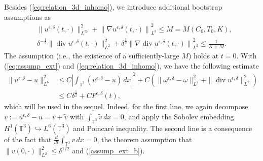 \documentclass[reqno,10pt]{amsart}
\theoremstyle{definition}
\theoremstyle{remark}
\numberwithin{equation}{section}
\DeclareMathOperator{\dive}{div}
\begin{document}
Besides (\ref{eq:relation_3d_inhomo}), we introduce additional bootstrap assumptions as
\begin{subequations} \label{eq:assump_ext}
\begin{align}
    &\|u^{\epsilon,\delta}(t,\cdot)\|_{L^\infty}^2 + {\| \nabla u^{\epsilon,\delta}(t,\cdot)\|}_{L^3}^2 \le M=M(C_0, T_0,K), \label{assump_ext_a} \\
    &\delta^{-\frac{1}{2}}\|\dive u^{\epsilon,\delta}(t,\cdot)\|_{L^2}^2 + \delta^{\frac{1}{2}} {\| \nabla\dive u^{\epsilon,\delta}(t,\cdot)\|}_{L^2}^2 \le \frac{1}{K+M}. \label{assump_ext_b}
\end{align}
\end{subequations}
The assumption (i.e., the existence of a sufficiently-large $M$) holds at $t=0$. With (\ref{eq:assump_ext}) and (\ref{eq:relation_3d_inhomo}), we have the following estimate
\begin{equation} \label{eq:v_L6}
\begin{split}
    \| u^{\epsilon,\delta}-u \|_{L^6}^2 &\le C \left| \int_{\mathbb T^3} (u^{\epsilon,\delta}-u) \,dx \right|^2 + C \left( \| \omega^{\epsilon,\delta}-\omega \|_{L^2}^2 + \| \dive u^{\epsilon,\delta} \|_{L^2}^2 \right) \\
    &\le C\delta^{\frac{1}{2}} + CF^{\epsilon,\delta}(t),
\end{split}
\end{equation}
which will be used in the sequel. Indeed, for the first line, we again decompose $v:=u^{\epsilon,\delta}-u = \bar v+\tilde v$ with $\int_{\mathbb T^3} \tilde v \,dx=0$, and apply the Sobolev embedding $H^1(\mathbb T^3)\hookrightarrow L^6(\mathbb T^3)$ and Poincar{\'e} inequality. The second line is a consequence of the fact that $\frac{d}{dt}\int_{\mathbb T^3} v \,dx=0$, the theorem assumption that $\|v(0,\cdot)\|_{L^2}^2\le \delta^{1/2}$ and (\ref{assump_ext_b}). 
\end{document}
